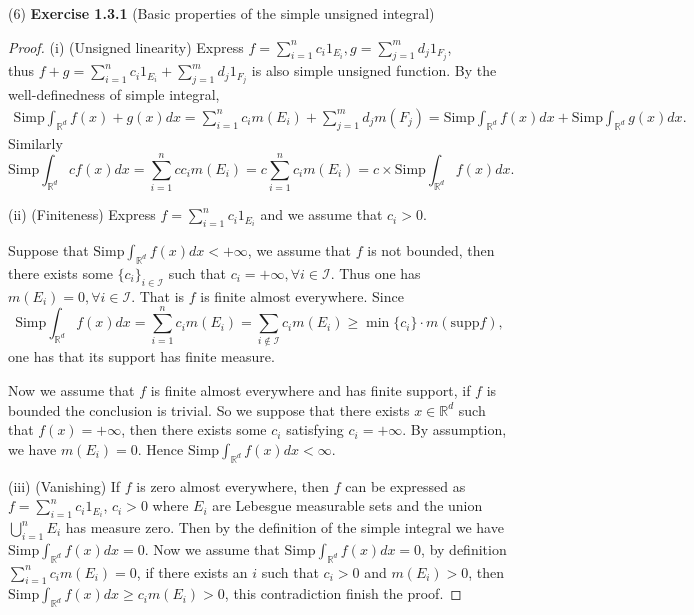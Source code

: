 \documentclass[a4paper]{article}
\begin{document}
(6) {\bfseries Exercise 1.3.1} (Basic properties of the simple unsigned integral)\begin{proof}
(i) (Unsigned linearity) Express $f = \sum_{i = 1}^n c_i1_{E_i}, g = \sum_{j = 1}^m d_j1_{F_j}$, \\thus 
$f + g = \sum_{i = 1}^n c_i1_{E_i} + \sum_{j = 1}^m d_j1_{F_j}$ is also simple unsigned function. By the 
well-definedness of simple integral, \begin{align*}
\mathrm{Simp}\int_{\mathbb{R}^d} f(x) + g(x) dx = \sum_{i = 1}^n c_i m(E_i) + \sum_{j = 1}^m d_jm(F_j) =
\mathrm{Simp}\int_{\mathbb{R}^d} f(x) dx + \mathrm{Simp}\int_{\mathbb{R}^d} g(x) dx.
\end{align*}
Similarly $$
\mathrm{Simp}\int_{\mathbb{R}^d} cf(x) dx = \sum_{i = 1}^n cc_im(E_i) = c\sum_{i = 1}^n c_im(E_i) =
c\times \mathrm{Simp}\int_{\mathbb{R}^d} f(x) dx.
$$

(ii) (Finiteness) Express $f = \sum_{i = 1}^n c_i1_{E_i}$ and we assume that $c_i > 0$.


Suppose that $\mathrm{Simp}\int_{\mathbb{R}^d} f(x) dx< +\infty$, we assume that $f$ is not bounded, then
there exists some $\{c_i\}_{i \in \mathcal{I}}$ such that $c_i = +\infty, \forall i \in \mathcal{I}$. Thus one has
$m(E_i) = 0, \forall i \in \mathcal{I}$. That is $f$ is finite almost everywhere. Since $$
\mathrm{Simp}\int_{\mathbb{R}^d} f(x) dx = \sum_{i = 1}^n c_im(E_i) = \sum_{i \not\in \mathcal{I}} c_im(E_i) \geq 
\min\{c_i\} \cdot m(\mathrm{supp} f),
$$one has that its support has finite measure.

Now we assume that $f$ is finite almost everywhere and has finite support, if $f$ is bounded the conclusion 
is trivial. So we suppose that there exists $x \in \mathbb{R}^d$ such that $f(x) = +\infty$, then there exists
some $c_i$ satisfying $c_i = +\infty$. By assumption, we have $m(E_i) = 0$. Hence $\mathrm{Simp}\int_{\mathbb{R}^d}
f(x) dx < \infty$.

(iii) (Vanishing) If $f$ is zero almost everywhere, then $f$ can be expressed as $f = \sum_{i = 1}^n c_i1_{E_i}$,
$c_i > 0$
where $E_i$ are Lebesgue measurable sets and the union $\bigcup_{i = 1}^n E_i$ has measure zero. Then by the 
definition of the simple integral we have $\mathrm{Simp}\int_{\mathbb{R}^d} f(x) dx = 0$.  Now we assume that
$\mathrm{Simp}\int_{\mathbb{R}^d} f(x) dx = 0$, by definition $\sum_{i = 1}^n c_im(E_i) = 0$, if there exists 
an $i$ such that $c_i > 0$ and $m(E_i) > 0$, then $\mathrm{Simp}\int_{\mathbb{R}^d} f(x) dx \geq c_im(E_i) > 0$,
this contradiction finish the proof.


\end{proof}
\end{document}
